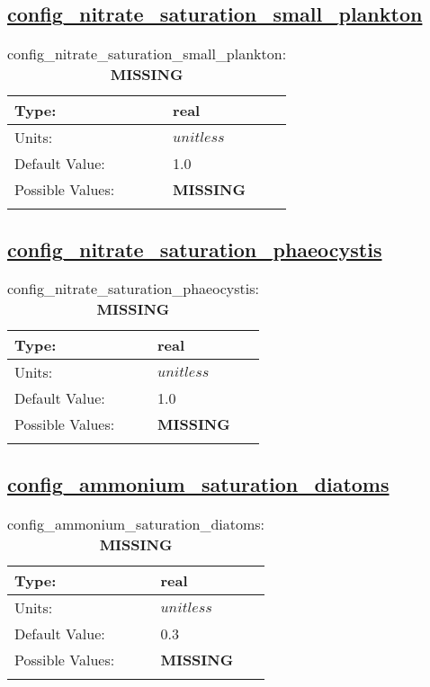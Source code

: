 \subsection[config\_nitrate\_saturation\_small\_plankton]{\hyperref[sec:nm_tab_biogeochemistry]{config\_nitrate\_saturation\_small\_plankton}}
\label{subsec:nm_sec_config_nitrate_saturation_small_plankton}
\begin{center}
\begin{longtable}{| p{2.0in} || p{4.0in} |}
    \hline
    Type: & real \\
    \hline
    Units: & $unitless$ \\
    \hline
    Default Value: & 1.0 \\
    \hline
    Possible Values: & {\bf \color{red} MISSING} \\
    \hline
    \caption{config\_nitrate\_saturation\_small\_plankton: {\bf \color{red} MISSING}}
\end{longtable}
\end{center}
\subsection[config\_nitrate\_saturation\_phaeocystis]{\hyperref[sec:nm_tab_biogeochemistry]{config\_nitrate\_saturation\_phaeocystis}}
\label{subsec:nm_sec_config_nitrate_saturation_phaeocystis}
\begin{center}
\begin{longtable}{| p{2.0in} || p{4.0in} |}
    \hline
    Type: & real \\
    \hline
    Units: & $unitless$ \\
    \hline
    Default Value: & 1.0 \\
    \hline
    Possible Values: & {\bf \color{red} MISSING} \\
    \hline
    \caption{config\_nitrate\_saturation\_phaeocystis: {\bf \color{red} MISSING}}
\end{longtable}
\end{center}
\subsection[config\_ammonium\_saturation\_diatoms]{\hyperref[sec:nm_tab_biogeochemistry]{config\_ammonium\_saturation\_diatoms}}
\label{subsec:nm_sec_config_ammonium_saturation_diatoms}
\begin{center}
\begin{longtable}{| p{2.0in} || p{4.0in} |}
    \hline
    Type: & real \\
    \hline
    Units: & $unitless$ \\
    \hline
    Default Value: & 0.3 \\
    \hline
    Possible Values: & {\bf \color{red} MISSING} \\
    \hline
    \caption{config\_ammonium\_saturation\_diatoms: {\bf \color{red} MISSING}}
\end{longtable}
\end{center}
